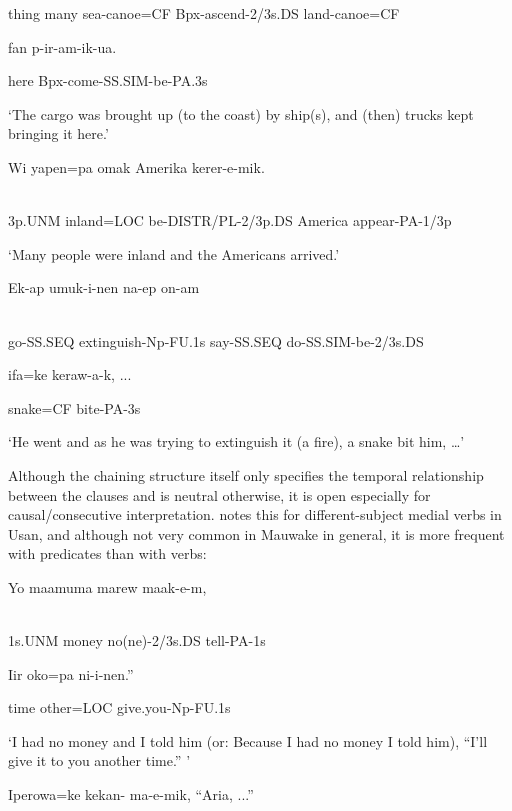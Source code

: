 thing  many  sea-canoe=CF  Bpx-ascend-2/3s.DS  land-canoe=CF

fan  p-ir-am-ik-ua.

here  Bpx-come-SS.SIM-be-PA.3s

`The cargo was brought up (to the coast) by ship(s), and (then) trucks kept bringing it here.'

\ea%
\label{ex:x1503}
\gll Wi  yapen=pa  omak  Amerika  kerer-e-mik. \\
      \\
\glt
\z

3p.UNM  inland=LOC  be-DISTR/PL-2/3p.DS  America  appear-PA-1/3p

`Many people were inland and the Americans arrived.'

\ea%
\label{ex:x1472}
\gll Ek-ap  umuk-i-nen  na-ep  on-am \\
      \\
\glt
\z

go-SS.SEQ  extinguish-Np-FU.1s  say-SS.SEQ  do-SS.SIM-be-2/3s.DS

ifa=ke  keraw-a-k,  ...

snake=CF  bite-PA-3s

`He went and as he was trying to extinguish it (a fire), a snake bit him, {\dots}'

Although the chaining structure itself only specifies the temporal relationship between the clauses and is neutral otherwise, it is open especially for causal/consecutive interpretation. \citet[237]{Reesink1983} notes this for different-subject medial verbs in Usan, and although not very common in Mauwake in general, it is more frequent with  predicates than with  verbs:

\ea%
\label{ex:x1434}
\gll Yo  maamuma  marew maak-e-m, \\
      \\
\glt
\z

1s.UNM  money  no(ne)-2/3s.DS  tell-PA-1s

{\textquotedbl}Iir  oko=pa  ni-i-nen.''

time  other=LOC  give.you-Np-FU.1s

`I had no money and I told him (or: Because I had no money I told him), ``I'll give it to you another time.'' '

\ea%
\label{ex:x1412}
\gll Iperowa=ke  kekan-  ma-e-mik,  ``Aria,  ...'' \\
      \\
\glt
\z

